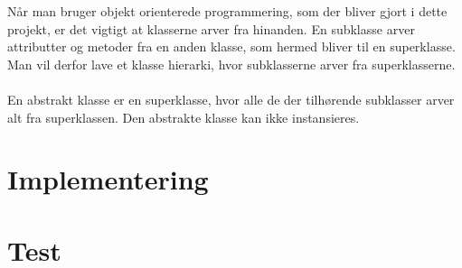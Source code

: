 \documentclass{article}
\begin{document}
Når man bruger objekt orienterede programmering, som der bliver gjort i dette projekt, er det vigtigt at klasserne arver fra hinanden. En subklasse arver attributter og metoder fra en anden klasse, som hermed bliver til en superklasse. Man vil derfor lave et klasse hierarki, hvor subklasserne arver fra superklasserne. 
\\
\\
En abstrakt klasse er en superklasse, hvor alle de der tilhørende subklasser arver alt fra superklassen. Den abstrakte klasse kan ikke instansieres. 

\break
\section{Implementering}

\section{Test}
\end{document}
